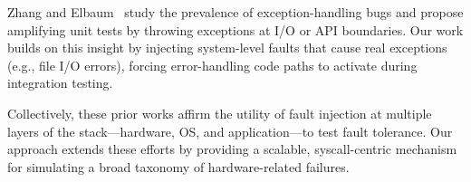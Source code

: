 Zhang and Elbaum~\cite{zhangelbaum2012} study the prevalence of exception-handling bugs and propose amplifying unit tests by throwing exceptions at I/O or API boundaries. Our work builds on this insight by injecting system-level faults that cause real exceptions (e.g., file I/O errors), forcing error-handling code paths to activate during integration testing.

\vspace{5pt}
Collectively, these prior works affirm the utility of fault injection at multiple layers of the stack—hardware, OS, and application—to test fault tolerance. Our approach extends these efforts by providing a scalable, syscall-centric mechanism for simulating a broad taxonomy of hardware-related failures.

